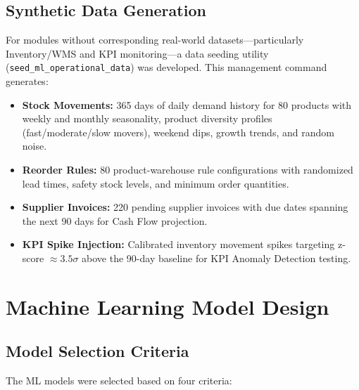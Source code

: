 \documentclass[12pt,a4paper]{report}
\begin{document}
\subsection{Synthetic Data Generation}

For modules without corresponding real-world datasets---particularly Inventory/WMS and KPI monitoring---a data seeding utility (\texttt{seed\_ml\_operational\_data}) was developed. This management command generates:

\begin{itemize}
  \item \textbf{Stock Movements:} 365 days of daily demand history for 80 products with weekly and monthly seasonality, product diversity profiles (fast/moderate/slow movers), weekend dips, growth trends, and random noise.

  \item \textbf{Reorder Rules:} 80 product-warehouse rule configurations with randomized lead times, safety stock levels, and minimum order quantities.

  \item \textbf{Supplier Invoices:} 220 pending supplier invoices with due dates spanning the next 90 days for Cash Flow projection.

  \item \textbf{KPI Spike Injection:} Calibrated inventory movement spikes targeting z-score $\approx 3.5\sigma$ above the 90-day baseline for KPI Anomaly Detection testing.
\end{itemize}


\section{Machine Learning Model Design}
\label{sec:ml_design}

\subsection{Model Selection Criteria}

The ML models were selected based on four criteria:
\end{document}
